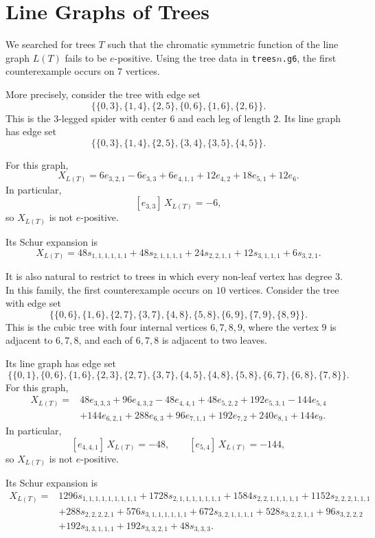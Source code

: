 \documentclass[11pt]{article}
\begin{document}
\section*{Line Graphs of Trees}

We searched for trees \(T\) such that the chromatic symmetric function of the
line graph \(L(T)\) fails to be \(e\)-positive. Using the tree data in
\texttt{trees\(n\).g6}, the first counterexample occurs on \(7\) vertices.

More precisely, consider the tree with edge set
\[
\{\{0,3\},\{1,4\},\{2,5\},\{0,6\},\{1,6\},\{2,6\}\}.
\]
This is the \(3\)-legged spider with center \(6\) and each leg of length \(2\).
Its line graph has edge set
\[
\{\{0,3\},\{1,4\},\{2,5\},\{3,4\},\{3,5\},\{4,5\}\}.
\]

For this graph,
\[
X_{L(T)}
=
6e_{3,2,1}
-6e_{3,3}
+6e_{4,1,1}
+12e_{4,2}
+18e_{5,1}
+12e_{6}.
\]
In particular,
\[
[e_{3,3}]\,X_{L(T)}=-6,
\]
so \(X_{L(T)}\) is not \(e\)-positive.

Its Schur expansion is
\[
X_{L(T)}
=
48s_{1,1,1,1,1,1}
+48s_{2,1,1,1,1}
+24s_{2,2,1,1}
+12s_{3,1,1,1}
+6s_{3,2,1}.
\]

\bigskip

It is also natural to restrict to trees in which every non-leaf vertex has
degree \(3\). In this family, the first counterexample occurs on \(10\)
vertices. Consider the tree with edge set
\[
\{\{0,6\},\{1,6\},\{2,7\},\{3,7\},\{4,8\},\{5,8\},\{6,9\},\{7,9\},\{8,9\}\}.
\]
This is the cubic tree with four internal vertices \(6,7,8,9\), where the
vertex \(9\) is adjacent to \(6,7,8\), and each of \(6,7,8\) is adjacent to two
leaves.

Its line graph has edge set
\[
\{\{0,1\},\{0,6\},\{1,6\},\{2,3\},\{2,7\},\{3,7\},\{4,5\},\{4,8\},\{5,8\},
\{6,7\},\{6,8\},\{7,8\}\}.
\]
For this graph,
\[
\begin{aligned}
X_{L(T)}={}&48e_{3,3,3}+96e_{4,3,2}-48e_{4,4,1}+48e_{5,2,2}+192e_{5,3,1}-144e_{5,4}\\
&+144e_{6,2,1}+288e_{6,3}+96e_{7,1,1}+192e_{7,2}+240e_{8,1}+144e_9.
\end{aligned}
\]
In particular,
\[
[e_{4,4,1}]\,X_{L(T)}=-48,
\qquad
[e_{5,4}]\,X_{L(T)}=-144,
\]
so \(X_{L(T)}\) is not \(e\)-positive.

Its Schur expansion is
\[
\begin{aligned}
X_{L(T)}={}&1296s_{1,1,1,1,1,1,1,1,1}
+1728s_{2,1,1,1,1,1,1,1}
+1584s_{2,2,1,1,1,1,1}
+1152s_{2,2,2,1,1,1}\\
&+288s_{2,2,2,2,1}
+576s_{3,1,1,1,1,1,1}
+672s_{3,2,1,1,1,1}
+528s_{3,2,2,1,1}
+96s_{3,2,2,2}\\
&+192s_{3,3,1,1,1}
+192s_{3,3,2,1}
+48s_{3,3,3}.
\end{aligned}
\]
\end{document}
